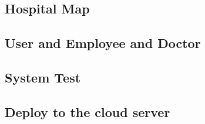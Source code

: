 \documentclass[a4paper]{article}
\begin{document}


\subsection{Hospital Map}

\subsection{User and Employee and Doctor}

\subsection{System Test}

\subsection{Deploy to the cloud server}
\end{document}
